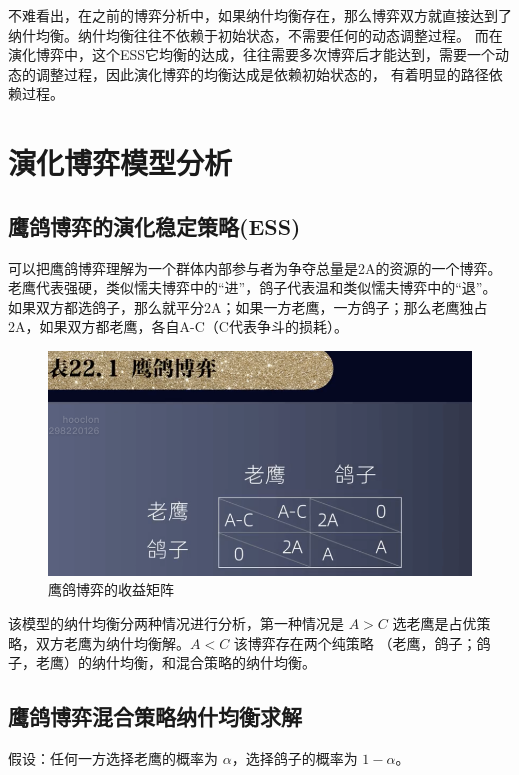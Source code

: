 \documentclass[12pt, a4paper]{article} %
\begin{document}
\begin{CJK*}{UTF8}{gbsn}
        不难看出，在之前的博弈分析中，如果纳什均衡存在，那么博弈双方就直接达到了纳什均衡。纳什均衡往往不依赖于初始状态，不需要任何的动态调整过程。
        而在演化博弈中，这个ESS它均衡的达成，往往需要多次博弈后才能达到，需要一个动态的调整过程，因此演化博弈的均衡达成是依赖初始状态的，
        有着明显的路径依赖过程。

        \clearpage
        \section{演化博弈模型分析}
        \subsection{鹰鸽博弈的演化稳定策略(ESS)}
        可以把鹰鸽博弈理解为一个群体内部参与者为争夺总量是2A的资源的一个博弈。老鹰代表强硬，类似懦夫博弈中的“进”，鸽子代表温和类似懦夫博弈中的“退”。
        如果双方都选鸽子，那么就平分2A；如果一方老鹰，一方鸽子；那么老鹰独占2A，如果双方都老鹰，各自A-C（C代表争斗的损耗）。

        \begin{figure}[htbp]
            \centering
            \includegraphics[width=1\textwidth]{./figures/catch2023-08-05-16.34.54.png}
            \caption{鹰鸽博弈的收益矩阵}
        \end{figure}

        该模型的纳什均衡分两种情况进行分析，第一种情况是 $A > C$ 选老鹰是占优策略，双方老鹰为纳什均衡解。$A < C$ 该博弈存在两个纯策略
        （老鹰，鸽子；鸽子，老鹰）的纳什均衡，和混合策略的纳什均衡。

        \subsection{鹰鸽博弈混合策略纳什均衡求解}
        假设：任何一方选择老鹰的概率为 $\alpha$，选择鸽子的概率为 $1- \alpha$。


\end{CJK*}
\end{document}
